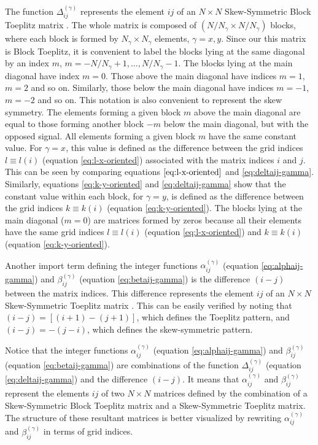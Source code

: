\documentclass[manuscript,revised]{geophysics}
\begin{document}
The function $\Delta_{ij}^{(\gamma)}$ represents the element $ij$ of
an $N \times N$ Skew-Symmetric Block Toeplitz matrix 
\citep[][ p. 161 and 217]{golub-vanloan2013}.
The whole matrix is composed of $(N/N_{\gamma} \times N/N_{\gamma})$ blocks,
where each block is formed by $N_{\gamma} \times N_{\gamma}$ elements, $\gamma = x, y$.
Since our this matrix is Block Toeplitz, it is convenient to label the 
blocks lying at the same diagonal by an index $m$,
$m = -N/N_{\gamma} + 1, \dots, N/N_{\gamma} - 1$. 
The blocks lying at the main diagonal have index
$m = 0$. Those above the main diagonal have indices $m = 1$, $m = 2$ and so on.
Similarly, those below the main diagonal have indices $m = -1$, $m = -2$ and so on.
This notation is also convenient to represent the skew symmetry. 
The elements forming a given block $m$ above the main diagonal are equal to those 
forming another block $-m$ below the main diagonal, but with the opposed signal.
All elements forming a given block $m$ have the same constant value.
For $\gamma = x$, this value is defined as the difference between the 
grid indices $l \equiv l(i)$ (equation \ref{eq:l-x-oriented}) associated with the matrix 
indices $i$ and $j$. This can be seen by comparing equations $\ref{eq:l-x-oriented}$
and \ref{eq:deltaij-gamma}. Similarly, equations \ref{eq:k-y-oriented}
and \ref{eq:deltaij-gamma} show that the constant value within each block,
for $\gamma = y$, is defined as the difference between the grid indices 
$k \equiv k(i)$ (equation \ref{eq:k-y-oriented}).
The blocks lying at the main diagonal ($m = 0$) are matrices formed by zeros because 
all their elements have the same grid indices $l \equiv l(i)$ (equation \ref{eq:l-x-oriented})
and $k \equiv k(i)$ (equation \ref{eq:k-y-oriented}).

Another import term defining the integer functions $\alpha_{ij}^{(\gamma)}$ 
(equation \ref{eq:alphaij-gamma}) and $\beta_{ij}^{(\gamma)}$ (equation \ref{eq:betaij-gamma})
is the difference $(i - j)$ between the matrix indices. This difference represents the 
element $ij$ of an $N \times N$ Skew-Symmetric Toeplitz matrix 
\citep[][ p. 161 and 208]{golub-vanloan2013}.
This can be easily verified by noting that $(i - j) = [(i+1) - (j+1)]$, which defines
the Toeplitz pattern, and $(i - j) = -(j - i)$, which defines the skew-symmetric pattern.

Notice that the integer functions $\alpha_{ij}^{(\gamma)}$ 
(equation \ref{eq:alphaij-gamma}) and $\beta_{ij}^{(\gamma)}$ (equation \ref{eq:betaij-gamma})
are combinations of the function $\Delta_{ij}^{(\gamma)}$ (equation \ref{eq:deltaij-gamma})
and the difference $(i - j)$. 
It means that $\alpha_{ij}^{(\gamma)}$ and 
$\beta_{ij}^{(\gamma)}$ represent the elements $ij$ of two $N \times N$ matrices
defined by the combination of a Skew-Symmetric Block Toeplitz matrix and
a Skew-Symmetric Toeplitz matrix.
The structure of these resultant matrices is better visualized by rewriting
$\alpha_{ij}^{(\gamma)}$ and $\beta_{ij}^{(\gamma)}$ in terms of grid indices.
\end{document}
